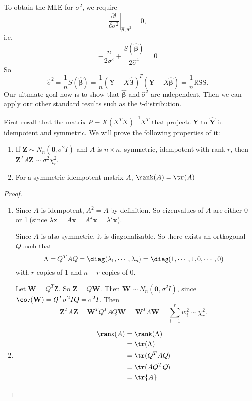 \documentclass[a4paper]{article}
\begin{document}
To obtain the MLE for $\sigma^2$, we require
\[
  \left.\frac{\partial l}{\partial \sigma^2}\right|_{\hat{\boldsymbol\beta}, \hat{\sigma}^2} = 0,
\]
i.e.\
\[
  -\frac{n}{2\sigma^2} + \frac{S(\hat{\boldsymbol\beta})}{2 \hat{\sigma}^4} = 0
\]
So
\[
  \hat{\sigma}^2 = \frac{1}{n}S(\hat{\boldsymbol\beta}) = \frac{1}{n}(\mathbf{Y} - X\hat{\boldsymbol\beta})^T(\mathbf{Y} - X\hat{\boldsymbol\beta}) = \frac{1}{n}\mathrm{RSS}.
\]
Our ultimate goal now is to show that $\hat{\boldsymbol\beta}$ and $\hat{\sigma}^2$ are independent. Then we can apply our other standard results such as the $t$-distribution.

First recall that the matrix $P = X(X^TX)^{-1}X^T$ that projects $\mathbf{Y}$ to $\hat{\mathbf{Y}}$ is idempotent and symmetric. We will prove the following properties of it:
\begin{lemma}\leavevmode
  \begin{enumerate}
    \item If $\mathbf{Z}\sim N_n(\mathbf{0}, \sigma^2 I)$ and $A$ is $n\times n$, symmetric, idempotent with rank $r$, then $\mathbf{Z}^TA\mathbf{Z} \sim \sigma^2 \chi_r^2$.
    \item For a symmetric idempotent matrix $A$, $\rank(A) = \tr(A)$.
  \end{enumerate}
\end{lemma}

\begin{proof}\leavevmode
  \begin{enumerate}
    \item Since $A$ is idempotent, $A^2 = A$ by definition. So eigenvalues of $A$ are either 0 or 1 (since $\lambda \mathbf{x} = A\mathbf{x} = A^2 \mathbf{x} = \lambda^2 \mathbf{x}$).

      Since $A$ is also symmetric, it is diagonalizable. So there exists an orthogonal $Q$ such that
      \[
        \Lambda = Q^TAQ = \diag(\lambda_1, \cdots, \lambda_n) = \diag(1, \cdots, 1, 0, \cdots, 0)
      \]
      with $r$ copies of 1 and $n - r$ copies of $0$.

      Let $\mathbf{W} = Q^T\mathbf{Z}$. So $\mathbf{Z} = Q\mathbf{W}$. Then $\mathbf{W}\sim N_n(\mathbf{0}, \sigma^2 I)$, since $\cov(\mathbf{W}) = Q^T\sigma^2 IQ = \sigma^2 I$. Then
      \[
        \mathbf{Z}^TA\mathbf{Z} = \mathbf{W}^T Q^TAQ\mathbf{W} = \mathbf{W}^T\Lambda \mathbf{W} = \sum_{i = 1}^r w_i^2 \sim \chi_r^2.
      \]
    \item
      \begin{align*}
        \rank (A) &= \rank (\Lambda)\\
        &= \tr (\Lambda)\\
        &= \tr (Q^TAQ)\\
        &= \tr (AQ^TQ)\\
        &= \tr {A}\qedhere
      \end{align*}%
  \end{enumerate}
\end{proof}
\end{document}
